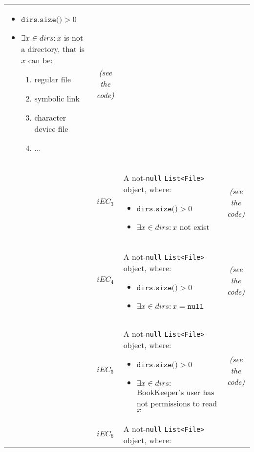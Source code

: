 \documentclass[sigconf]{acmart}
\begin{document}
\begin{table*}
\begin{tabular}{l|cm{10.5cm}|c}
    \begin{itemize}
	\item $\texttt{dirs.size()} > 0$
	\item $\exists x \in dirs : x$ is not a directory, that is $x$ can be:
	\begin{enumerate}
	\item regular file
	\item symbolic link
	\item character device file
	\item ...
	\end{enumerate}
	\end{itemize}
   
    & \textit{(see the code)}
    
    \\\cline{2-4}   
    & $iEC_3$ & A not-\texttt{null} \texttt{List<File>} object, where: 
    
    \begin{itemize}
	\item $\texttt{dirs.size()} > 0$
	\item $\exists x \in dirs : x$ not exist
	\end{itemize}
   
    & \textit{(see the code)}
   
    \\\cline{2-4}   
    
    & $iEC_4$ & A not-\texttt{null} \texttt{List<File>} object, where: 
    
    \begin{itemize}
	\item $\texttt{dirs.size()} > 0$
	\item $\exists x \in dirs : x = \texttt{null}$
	\end{itemize}
   
    & \textit{(see the code)}
    
    \\\cline{2-4}   
    & $iEC_5$ & A not-\texttt{null} \texttt{List<File>} object, where: 
    
    \begin{itemize}
	\item $\texttt{dirs.size()} > 0$
	\item $\exists x \in dirs : $ BookKeeper's user has not permissions to read $x$ 
	\end{itemize}
   
    & \textit{(see the code)}
    
     \\\cline{2-4}   
    & $iEC_6$ & A not-\texttt{null} \texttt{List<File>} object, where: 
    

\end{tabular}
\end{table*}
\end{document}
